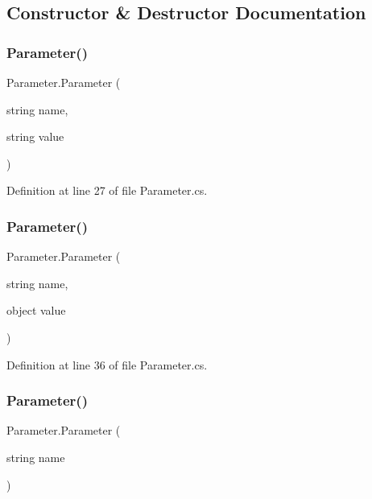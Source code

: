 \subsection{Constructor \& Destructor Documentation}
\mbox{\label{class_parameter_a4e866bc9dece89fbbc36ec7538bb8136}} 
\subsubsection{\texorpdfstring{Parameter()}{Parameter()}\hspace{0.1cm}{\footnotesize\ttfamily [1/5]}}
{\footnotesize\ttfamily Parameter.\+Parameter (\begin{DoxyParamCaption}\item[{string}]{name,  }\item[{string}]{value }\end{DoxyParamCaption})}



Definition at line 27 of file Parameter.\+cs.

\mbox{\label{class_parameter_a22400d09fa4d9e51bab72496d5d4f65f}} 
\subsubsection{\texorpdfstring{Parameter()}{Parameter()}\hspace{0.1cm}{\footnotesize\ttfamily [2/5]}}
{\footnotesize\ttfamily Parameter.\+Parameter (\begin{DoxyParamCaption}\item[{string}]{name,  }\item[{object}]{value }\end{DoxyParamCaption})}



Definition at line 36 of file Parameter.\+cs.

\mbox{\label{class_parameter_ad275dc0185cb53c2c2f34eda4052adb8}} 
\subsubsection{\texorpdfstring{Parameter()}{Parameter()}\hspace{0.1cm}{\footnotesize\ttfamily [3/5]}}
{\footnotesize\ttfamily Parameter.\+Parameter (\begin{DoxyParamCaption}\item[{string}]{name }\end{DoxyParamCaption})}



